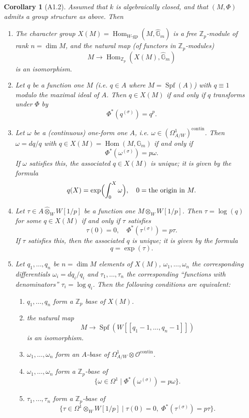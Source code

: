 \documentclass[12pt,a4paper]{article}
\theoremstyle{plain}
\newtheorem{corollary}[theorem]{Corollary}
\theoremstyle{definition}
\theoremstyle{remark}
\DeclareMathOperator{\Hom}{Hom}
\DeclareMathOperator{\Spf}{Spf}
\providecommand{\Hom}{\operatorname{Hom}}
\begin{document}
\begin{corollary}[A1.2]
Assumed that $k$ is algebraically closed, and that $(M, \Phi)$ admits a group structure as above. Then
\begin{enumerate}[label=(\arabic*)]
\item The character group $X(M) = \Hom_{W\text{-gp}}(M, \hat{\mathbb{G}}_m)$ is a free $\mathbb{Z}_p$-module of rank $n = \dim M$, and the natural map (of functors in $\mathbb{Z}_p$-modules)
\[
M \longrightarrow \Hom_{\mathbb{Z}_p}(X(M), \hat{\mathbb{G}}_m)
\]
is an isomorphism.
\item Let $q$ be a function one $M$ (i.e. $q \in A$ where $M = \Spf(A)$) with $q \equiv 1$ modulo the maximal ideal of $A$. Then $q \in X(M)$ if and only if $q$ transforms under $\Phi$ by
\[
\Phi^*(q^{(\sigma)}) = q^p.
\]
\item Let $\omega$ be a (continuous) one-form one $A$, i.e. $\omega \in (\Omega^1_{A/W})^{\mathrm{contin}}$. Then $\omega = dq/q$ with $q \in X(M) = \Hom(M, \mathbb{G}_m)$ if and only if
\[
\Phi^*(\omega^{(\sigma)}) = p\omega.
\]
If $\omega$ satisfies this, the associated $q \in X(M)$ is unique; it is given by the formula
\[
q(X) = \exp\Bigl(\int_0^X \omega\Bigr), \quad 0 = \text{the origin in } M.
\]
\item Let $\tau \in A \hat{\otimes}_W W[1/p]$ be a function one $M \otimes_W W[1/p]$. Then $\tau = \log(q)$ for some $q \in X(M)$ if and only if $\tau$ satisfies
\[
\tau(0) = 0, \quad \Phi^*(\tau^{(\sigma)}) = p\tau.
\]
If $\tau$ satisfies this, then the associated $q$ is unique; it is given by the formula
\[
q = \exp(\tau).
\]
\item Let $q_1, \ldots, q_n$ be $n = \dim M$ elements of $X(M)$, $\omega_1, \ldots, \omega_n$ the corresponding differentials $\omega_i = dq_i/q_i$ and $\tau_1, \ldots, \tau_n$ the corresponding ``functions with denominators'' $\tau_i = \log q_i$. Then the following conditions are equivalent:
\begin{enumerate}[label=\alph*)]
\item $q_1, \ldots, q_n$ form a $\mathbb{Z}_p$ base of $X(M)$.
\item the natural map
\[
M \longrightarrow \Spf(W[[q_1 - 1, \ldots, q_n - 1]])
\]
is an isomorphism.
\item $\omega_1, \ldots, \omega_n$ form an $A$-base of $\Omega^1_{A/W} \otimes \mathcal{O}^{\mathrm{contin}}$.
\item $\omega_1, \ldots, \omega_n$ form a $\mathbb{Z}_p$-base of
\[
\{\omega \in \Omega^1 \mid \Phi^*(\omega^{(\sigma)}) = p\omega\}.
\]
\item $\tau_1, \ldots, \tau_n$ form a $\mathbb{Z}_p$-base of
\[
\{\tau \in \Omega^1 \otimes_W W[1/p] \mid \tau(0) = 0, \; \Phi^*(\tau^{(\sigma)}) = p\tau\}.
\]
\end{enumerate}
\end{enumerate}
\end{corollary}
\end{document}
